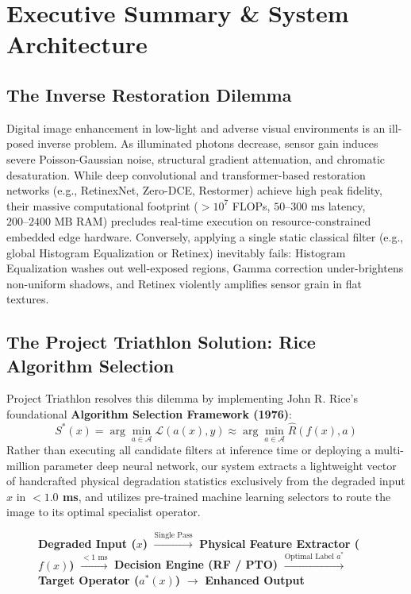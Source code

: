 \documentclass[10pt,a4paper]{article}
\begin{document}
\newpage
\tableofcontents
\newpage

\section{Executive Summary \& System Architecture}

\subsection{The Inverse Restoration Dilemma}
Digital image enhancement in low-light and adverse visual environments is an ill-posed inverse problem. As illuminated photons decrease, sensor gain induces severe Poisson-Gaussian noise, structural gradient attenuation, and chromatic desaturation. While deep convolutional and transformer-based restoration networks (e.g., RetinexNet, Zero-DCE, Restormer) achieve high peak fidelity, their massive computational footprint ($>10^7$ FLOPs, $50\text{--}300\text{ ms}$ latency, $200\text{--}2400\text{ MB}$ RAM) precludes real-time execution on resource-constrained embedded edge hardware. Conversely, applying a single static classical filter (e.g., global Histogram Equalization or Retinex) inevitably fails: Histogram Equalization washes out well-exposed regions, Gamma correction under-brightens non-uniform shadows, and Retinex violently amplifies sensor grain in flat textures.

\subsection{The Project Triathlon Solution: Rice Algorithm Selection}
Project Triathlon resolves this dilemma by implementing John R. Rice's foundational \textbf{Algorithm Selection Framework (1976)}:
\begin{equation}
S^*(x) = \arg\min_{a \in \mathcal{A}} \mathcal{L}(a(x), y) \approx \arg\min_{a \in \mathcal{A}} \hat{R}(f(x), a)
\end{equation}
Rather than executing all candidate filters at inference time or deploying a multi-million parameter deep neural network, our system extracts a lightweight vector of handcrafted physical degradation statistics exclusively from the degraded input $x$ in \textbf{$<1.0$ ms}, and utilizes pre-trained machine learning selectors to route the image to its optimal specialist operator.

\begin{figure}[htbp]
\centering
\begin{tcolorbox}[colback=lightgray,colframe=primaryblue,arc=2mm,title=\textbf{System Architectural Flow}]
\small
\textbf{Degraded Input ($x$)} $\xrightarrow{\text{Single Pass}}$ \textbf{Physical Feature Extractor ($f(x)$)} $\xrightarrow{<1\text{ ms}}$ \textbf{Decision Engine (RF / PTO)} $\xrightarrow{\text{Optimal Label } a^*}$ \textbf{Target Operator ($a^*(x)$)} $\longrightarrow$ \textbf{Enhanced Output}
\end{tcolorbox}
\end{figure}
\end{document}
